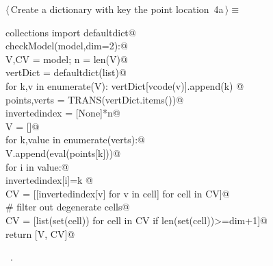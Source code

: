 \documentclass[11pt,oneside]{article}	%
\begin{document}
\begin{flushleft} \small \label{scrap4}
\protect{}$\langle\,$Create a dictionary with key the point location\nobreak\ {\footnotesize 4a}$\,\rangle\equiv$
\vspace{-1ex}
\begin{list}{}{} \item
\mbox{}\verb@from collections import defaultdict@\\
\mbox{}\verb@def checkModel(model,dim=2):@\\
\mbox{}\verb@   V,CV = model; n = len(V)@\\
\mbox{}\verb@   vertDict = defaultdict(list)@\\
\mbox{}\verb@   for k,v in enumerate(V): vertDict[vcode(v)].append(k) @\\
\mbox{}\verb@   points,verts = TRANS(vertDict.items())@\\
\mbox{}\verb@   invertedindex = [None]*n@\\
\mbox{}\verb@   V = []@\\
\mbox{}\verb@   for k,value in enumerate(verts):@\\
\mbox{}\verb@      V.append(eval(points[k]))@\\
\mbox{}\verb@      for i in value:@\\
\mbox{}\verb@         invertedindex[i]=k   @\\
\mbox{}\verb@   CV = [[invertedindex[v] for v in cell] for cell in CV]@\\
\mbox{}\verb@   # filter out degenerate cells@\\
\mbox{}\verb@   CV = [list(set(cell)) for cell in CV if len(set(cell))>=dim+1]@\\
\mbox{}\verb@   return [V, CV]@\\
\mbox{}\verb@@{\NWsep}
\end{list}
\vspace{-1ex}
\footnotesize\addtolength{\baselineskip}{-1ex}
\begin{list}{}{\setlength{\itemsep}{-\parsep}\setlength{\itemindent}{-\leftmargin}}
\item \NWtxtMacroRefIn\ .
\end{list}
\end{flushleft}
\end{document}

